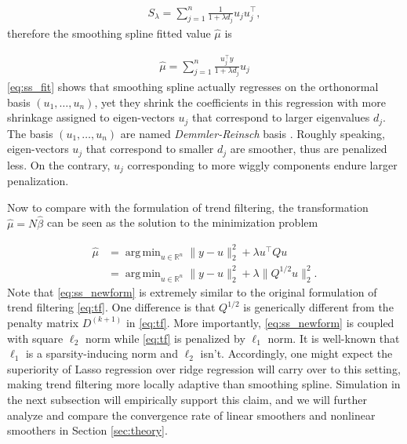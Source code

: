 \documentclass[a4paper]{article}
\DeclareMathOperator*{\argmin}{arg\,min}
\newcommand{\RR}{\mathbb{R}}
\begin{document}
\begin{align*}
S_\lambda = \sum_{j=1}^n \frac{1}{1+\lambda d_j}u_ju_j^\top,
\end{align*}
therefore the smoothing spline fitted value $\hat{\mu}$ is 

\begin{align}
\hat{\mu} = \sum_{j=1}^n \frac{u_j^\top y}{1+\lambda d_j}u_j
\label{eq:ss_fit}
\end{align}
\eqref{eq:ss_fit} shows that smoothing spline actually regresses on the orthonormal basis $(u_1,\ldots, u_n)$, yet they shrink the coefficients in this regression with more shrinkage assigned to eigen-vectors $u_j$ that correspond to larger eigenvalues $d_j$. The basis $(u_1,\ldots, u_n)$ are named \textit{Demmler-Reinsch} basis \cite{demmler1975oscillation}. Roughly speaking, eigen-vectors $u_j$ that correspond to smaller $d_j$ are smoother, thus are penalized less. On the contrary, $u_j$ corresponding to more wiggly components endure larger penalization. 

Now to compare with the formulation of trend filtering, the transformation $\hat{\mu} = N\hat{\beta}$ can be seen as the solution to the minimization problem

\begin{equation}
\begin{aligned}
\hat{\mu} &= \argmin_{u\in\RR^n} \|y-u\|_2^2 + \lambda u^\top Qu\\
&= \argmin_{u\in\RR^n} \|y-u\|_2^2 + \lambda\|Q^{1/2}u\|_2^2.
\label{eq:ss_newform}
\end{aligned}
\end{equation}
Note that \eqref{eq:ss_newform} is extremely similar to the original formulation of trend filtering \eqref{eq:tf}. One difference is that $Q^{1/2}$ is generically different from the penalty matrix $D^{(k+1)}$ in \eqref{eq:tf}. More importantly, \eqref{eq:ss_newform} is coupled with square $\ell_2$ norm while \eqref{eq:tf} is penalized by $\ell_1$ norm. It is well-known that $\ell_1$ is a sparsity-inducing norm and $\ell_2$ isn't. Accordingly, one might expect the superiority of Lasso regression over ridge regression will carry over to this setting, making trend filtering more locally adaptive than smoothing spline. Simulation in the next subsection will empirically support this claim, and we will further analyze and compare the convergence rate of linear smoothers and nonlinear smoothers in Section \ref{sec:theory}.
\end{document}
